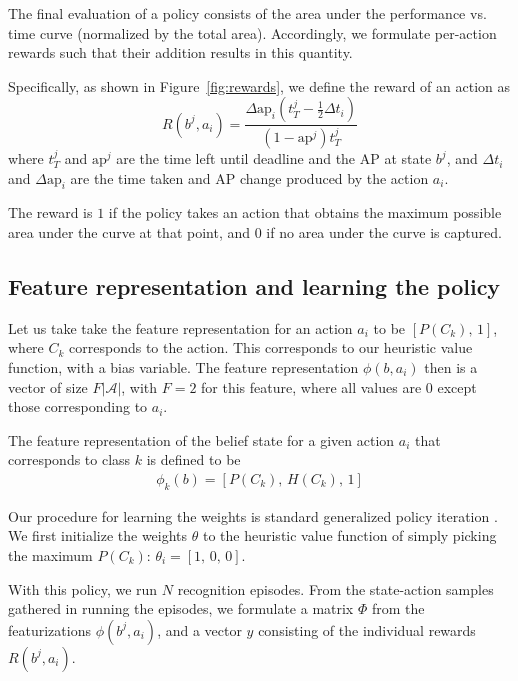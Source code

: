 The final evaluation of a policy consists of the area under the performance vs. time curve (normalized by the total area).
Accordingly, we formulate per-action rewards such that their addition results in this quantity.

Specifically, as shown in Figure~\ref{fig:rewards}, we define the reward of an action as
\begin{equation}\label{eq:advanced}
R(b^j,a_i) = \frac{\Delta \text{ap}_i (t_T^j-\frac{1}{2}\Delta t_i)}{(1-\text{ap}^j)t_T^j}
\end{equation}
where $t_T^j$ and $\text{ap}^j$ are the time left until deadline and the AP at state $b^j$, and $\Delta t_i$ and $\Delta \text{ap}_i$ are the time taken and AP change produced by the action $a_i$.

The reward is $1$ if the policy takes an action that obtains the maximum possible area under the curve at that point, and $0$ if no area under the curve is captured.


\subsection{Feature representation and learning the policy}

Let us take take the feature representation for an action $a_i$ to be $[P(C_k), \, 1]$, where $C_k$ corresponds to the action.
This corresponds to our heuristic value function, with a bias variable.
The feature representation $\phi(b,a_i)$ then is a vector of size $F|\mathcal{A}|$, with $F=2$ for this feature, where all values are $0$ except those corresponding to $a_i$.

The feature representation of the belief state for a given action $a_i$ that corresponds to class $k$ is defined to be
\begin{align}
\phi_k(b) = [P(C_k), \, H(C_k), \, 1]
\end{align}

Our procedure for learning the weights is standard generalized policy iteration \cite{Sutton1998}.
We first initialize the weights $\theta$ to the heuristic value function of simply picking the maximum $P(C_k)$: $\theta_i = [1, \,0, \,0]$.

With this policy, we run $N$ recognition episodes.
From the state-action samples gathered in running the episodes, we formulate a matrix $\Phi$ from the featurizations $\phi(b^j,a_i)$, and a vector $y$ consisting of the individual rewards $R(b^j,a_i)$.

